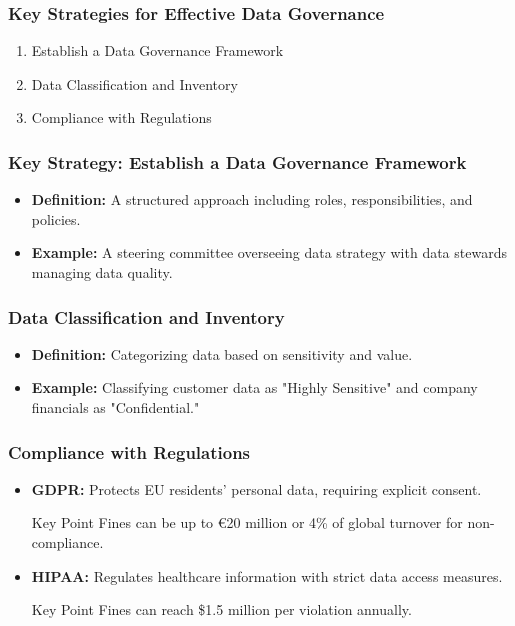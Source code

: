 \documentclass[aspectratio=169]{beamer}
\begin{document}
\begin{frame}[fragile]
    \frametitle{Key Strategies for Effective Data Governance}
    \begin{enumerate}
        \item Establish a Data Governance Framework
        \item Data Classification and Inventory
        \item Compliance with Regulations
    \end{enumerate}
\end{frame}

\begin{frame}[fragile]
    \frametitle{Key Strategy: Establish a Data Governance Framework}
    \begin{itemize}
        \item \textbf{Definition:} A structured approach including roles, responsibilities, and policies.
        \item \textbf{Example:} A steering committee overseeing data strategy with data stewards managing data quality.
    \end{itemize}
\end{frame}

\begin{frame}[fragile]
    \frametitle{Data Classification and Inventory}
    \begin{itemize}
        \item \textbf{Definition:} Categorizing data based on sensitivity and value.
        \item \textbf{Example:} Classifying customer data as "Highly Sensitive" and company financials as "Confidential."
    \end{itemize}
\end{frame}

\begin{frame}[fragile]
    \frametitle{Compliance with Regulations}
    \begin{itemize}
        \item \textbf{GDPR:} Protects EU residents' personal data, requiring explicit consent.
            \begin{block}{Key Point}
                Fines can be up to €20 million or 4\% of global turnover for non-compliance.
            \end{block}
        \item \textbf{HIPAA:} Regulates healthcare information with strict data access measures.
            \begin{block}{Key Point}
                Fines can reach \$1.5 million per violation annually.
            \end{block}
    \end{itemize}
\end{frame}
\end{document}

